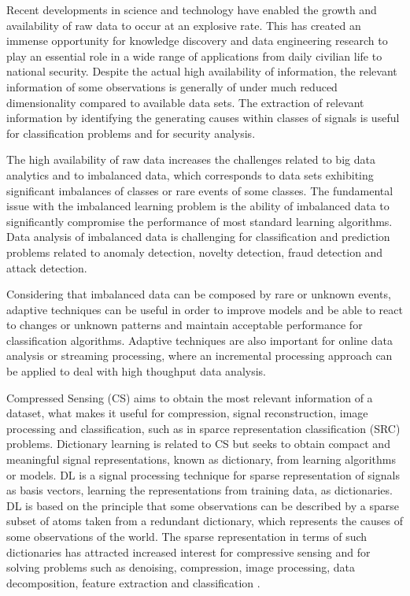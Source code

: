 Recent developments in science and technology have enabled the growth and availability of raw data to occur at an explosive rate. This has created an immense opportunity for knowledge discovery and data engineering research to play an essential role in a wide range of applications from daily civilian life to national security. Despite the actual high availability of information, the relevant information of some observations is generally of under much reduced dimensionality compared to available data sets. The extraction of relevant information by identifying the generating causes within classes of signals is useful for classification problems and for security analysis. 

The high availability of raw data increases the challenges related to big data analytics and to imbalanced data, which corresponds to data sets exhibiting significant imbalances of classes or rare events of some classes. The fundamental issue with the imbalanced learning problem is the ability of imbalanced data to significantly compromise the performance of most standard learning algorithms. Data analysis of imbalanced data is challenging for classification and prediction problems related to anomaly detection, novelty detection, fraud detection and attack detection. 

Considering that imbalanced data can be composed by rare or unknown events, adaptive techniques can be useful in order to improve models and be able to react to changes or unknown patterns and maintain acceptable performance for classification algorithms. Adaptive techniques are also important for online data analysis or streaming processing, where an incremental processing approach can be applied to deal with high thoughput data analysis.

Compressed Sensing (CS) aims to obtain the most relevant information of a dataset, what makes it useful for compression, signal reconstruction, image processing and classification, such as in sparce representation classification (SRC) problems. Dictionary learning is related to CS but seeks to obtain compact and meaningful signal representations, known as dictionary, from learning algorithms or models. DL is a signal processing technique for sparse representation of signals as basis vectors, learning the representations from training data, as dictionaries. DL is based on the principle that some observations can be described by a sparse subset of atoms taken from a redundant dictionary, which represents the causes of some observations of the world. The sparse representation in terms of such dictionaries has attracted increased interest for compressive sensing and for solving problems such as denoising, compression, image processing, data decomposition, feature extraction and classification \cite{tosic2011dictionary, zhang2010discriminative, zhu2016coupled,ravishankar2011mr}. 

